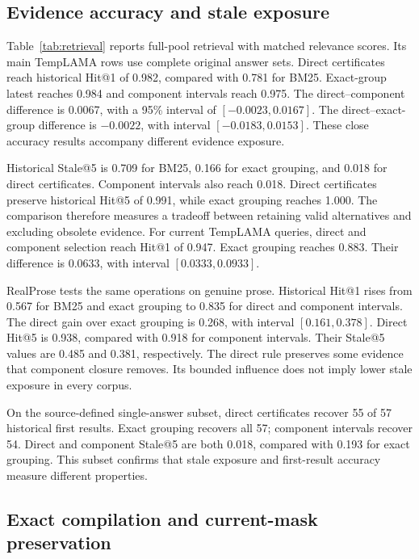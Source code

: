 \subsection{Evidence accuracy and stale exposure}

Table~\ref{tab:retrieval} reports full-pool retrieval with matched relevance scores.
Its main TempLAMA rows use complete original answer sets.
Direct certificates reach historical Hit@1 of 0.982, compared with 0.781 for BM25.
Exact-group latest reaches 0.984 and component intervals reach 0.975.
The direct--component difference is 0.0067, with a 95\% interval of $[-0.0023,0.0167]$.
The direct--exact-group difference is $-0.0022$, with interval $[-0.0183,0.0153]$.
These close accuracy results accompany different evidence exposure.


Historical Stale@5 is 0.709 for BM25, 0.166 for exact grouping, and 0.018 for direct certificates.
Component intervals also reach 0.018.
Direct certificates preserve historical Hit@5 of 0.991, while exact grouping reaches 1.000.
The comparison therefore measures a tradeoff between retaining valid alternatives and excluding obsolete evidence.
For current TempLAMA queries, direct and component selection reach Hit@1 of 0.947.
Exact grouping reaches 0.883.
Their difference is 0.0633, with interval $[0.0333,0.0933]$.

RealProse tests the same operations on genuine prose.
Historical Hit@1 rises from 0.567 for BM25 and exact grouping to 0.835 for direct and component intervals.
The direct gain over exact grouping is 0.268, with interval $[0.161,0.378]$.
Direct Hit@5 is 0.938, compared with 0.918 for component intervals.
Their Stale@5 values are 0.485 and 0.381, respectively.
The direct rule preserves some evidence that component closure removes.
Its bounded influence does not imply lower stale exposure in every corpus.

On the source-defined single-answer subset, direct certificates recover 55 of 57 historical first results.
Exact grouping recovers all 57; component intervals recover 54.
Direct and component Stale@5 are both 0.018, compared with 0.193 for exact grouping.
This subset confirms that stale exposure and first-result accuracy measure different properties.

\subsection{Exact compilation and current-mask preservation}

